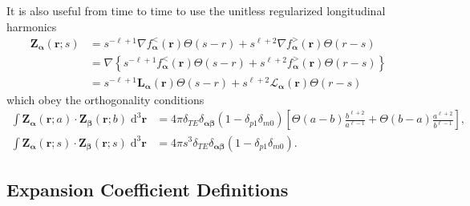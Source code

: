 \documentclass{article}
\begin{document}
It is also useful from time to time to use the unitless regularized longitudinal harmonics
\begin{equation}
\begin{split}
\mathbf{Z}_{\bm{\alpha}}(\mathbf{r};s) &= s^{-\ell + 1}\nabla f_{\bm{\alpha}}^<(\mathbf{r})\Theta(s - r) + s^{\ell + 2}\nabla f_{\bm{\alpha}}^>(\mathbf{r})\Theta(r - s)\\
&= \nabla\left\{s^{-\ell + 1} f_{\bm{\alpha}}^<(\mathbf{r})\Theta(s - r) + s^{\ell + 2} f_{\bm{\alpha}}^>(\mathbf{r})\Theta(r - s)\right\}\\
&= s^{-\ell + 1}\mathbf{L}_{\bm{\alpha}}(\mathbf{r})\Theta(s - r) + s^{\ell + 2}\bm{\mathcal{L}}_{\bm{\alpha}}(\mathbf{r})\Theta(r - s)
\end{split}
\end{equation}
which obey the orthogonality conditions
\begin{equation}\label{eq:longitudinalHarmonicOrthogonality}
\begin{split}
\int\mathbf{Z}_{\bm{\alpha}}(\mathbf{r};a)\cdot\mathbf{Z}_{\bm{\beta}}(\mathbf{r};b)\;\mathrm{d}^3\mathbf{r} &= 4\pi\delta_{TE}\delta_{\bm{\alpha}\bm{\beta}}(1 - \delta_{p1}\delta_{m0})\left[\Theta(a - b)\frac{b^{\ell + 2}}{a^{\ell - 1}} + \Theta(b - a)\frac{a^{\ell + 2}}{b^{\ell - 1}}\right],\\
\int\mathbf{Z}_{\bm{\alpha}}(\mathbf{r};s)\cdot\mathbf{Z}_{\bm{\beta}}(\mathbf{r};s)\;\mathrm{d}^3\mathbf{r} &= 4\pi s^3\delta_{TE}\delta_{\bm{\alpha}\bm{\beta}}(1 - \delta_{p1}\delta_{m0}).
\end{split}
\end{equation}







\subsection{Expansion Coefficient Definitions}
\end{document}
